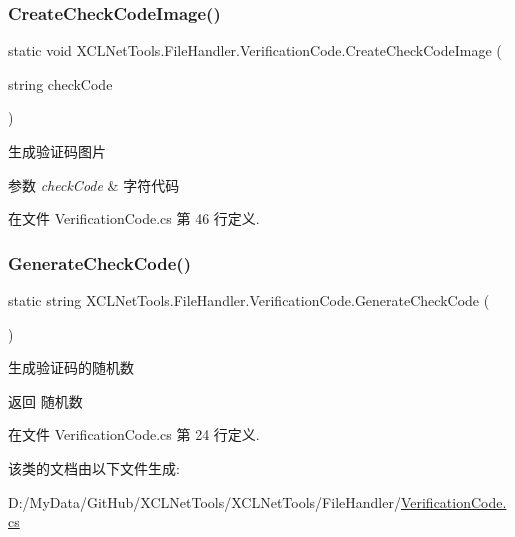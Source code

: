 \subsubsection{\texorpdfstring{Create\+Check\+Code\+Image()}{CreateCheckCodeImage()}}
{\footnotesize\ttfamily static void X\+C\+L\+Net\+Tools.\+File\+Handler.\+Verification\+Code.\+Create\+Check\+Code\+Image (\begin{DoxyParamCaption}\item[{string}]{check\+Code }\end{DoxyParamCaption})\hspace{0.3cm}{\ttfamily [static]}}



生成验证码图片 


\begin{DoxyParams}{参数}
{\em check\+Code} & 字符代码\\
\hline
\end{DoxyParams}


在文件 Verification\+Code.\+cs 第 46 行定义.

\mbox{\label{class_x_c_l_net_tools_1_1_file_handler_1_1_verification_code_af4beced22b07b395e6ae37452a895f32}} 
\subsubsection{\texorpdfstring{Generate\+Check\+Code()}{GenerateCheckCode()}}
{\footnotesize\ttfamily static string X\+C\+L\+Net\+Tools.\+File\+Handler.\+Verification\+Code.\+Generate\+Check\+Code (\begin{DoxyParamCaption}{ }\end{DoxyParamCaption})\hspace{0.3cm}{\ttfamily [static]}}



生成验证码的随机数 

\begin{DoxyReturn}{返回}
随机数
\end{DoxyReturn}


在文件 Verification\+Code.\+cs 第 24 行定义.



该类的文档由以下文件生成\+:\begin{DoxyCompactItemize}
\item 
D\+:/\+My\+Data/\+Git\+Hub/\+X\+C\+L\+Net\+Tools/\+X\+C\+L\+Net\+Tools/\+File\+Handler/\hyperlink{_verification_code_8cs}{Verification\+Code.\+cs}\end{DoxyCompactItemize}
